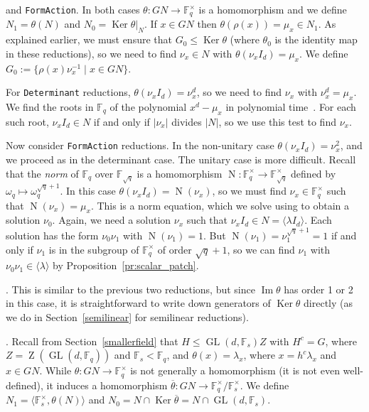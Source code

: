 \documentclass[12pt,twoside,reqno,psamsfonts]{amsproc}
\numberwithin{equation}{section}
\numberwithin{figure}{section}
\theoremstyle{plain}
\theoremstyle{definition}
\theoremstyle{remark}
\providecommand{\abs}[1]{\left\lvert #1 \right\rvert}
\newcommand{\field}[1]{\mathbb{#1}}
\newcommand{\F}{\field{F}}
\DeclareMathOperator{\GL}{GL}
\DeclareMathOperator{\Norm}{N}
\DeclareMathOperator{\Zent}{Z}
\DeclareMathOperator{\Ker}{Ker}
\DeclareMathOperator{\Imm}{Im}
\begin{document}
\vspace*{0.1cm}  and {\tt FormAction}.
In both cases $\theta:GN \to \F_q^{\times}$ is a homomorphism and we
define $N_1 = \theta(N)$ and $N_0 =  \Ker \theta|_N$.
If $x \in GN$ then $\theta(\rho(x)) = \mu_x \in N_1$.
As explained earlier, we must ensure that $G_0 \leqslant \Ker \theta$
(where $\theta_0$ is the identity map in these reductions),
so we need to find $\nu_x \in N$ with $\theta(\nu_x I_d) = \mu_x$.
We define $G_0 := \{ \rho(x) \nu_x^{-1} \mid x \in GN \}$.

For {\tt Determinant} reductions, $\theta(\nu_x I_d) = \nu_x^d$, so
we need to find $\nu_x$ with $\nu_x^d = \mu_x$. We 
find the roots in $\F_q$ of the polynomial $x^d - \mu_x$ in polynomial
time~\cite[Theorem 8.12]{Geddesetal92}.
For each such root, $\nu_x I_d \in N$ if and only if $\abs{\nu_x}$ divides
$\abs{N}$, so we use this test to find $\nu_x$.

Now consider {\tt FormAction} reductions. In the non-unitary case
$\theta(\nu_x I_d) = \nu_x^2$, and we proceed as in the determinant case.
The unitary case is more difficult. Recall that the \emph{norm} of
$\F_q$ over $\F_{\sqrt{q}}$ is a homomorphism 
$\Norm : \F_q^{\times} \to \F_{\sqrt{q}}^{\times}$ 
defined by $\omega_q \mapsto \omega_q^{\sqrt{q} + 1}$.
In this case $\theta(\nu_x I_d)  = \Norm(\nu_x)$, so we must find
$\nu_x \in \F_{q}^{\times}$ such that $\Norm(\nu_x) = \mu_x$. This is a norm
equation, which we solve using \cite[Proposition 2.2]{spinornorms} 
to obtain a solution $\nu_0$. Again, we need a solution $\nu_x$ such that
$\nu_x I_d \in N = \langle \lambda I_d \rangle$.
Each solution has the form $\nu_0 \nu_1$ with $\Norm(\nu_1) = 1$.
But $\Norm(\nu_1) = \nu_1^{\sqrt{q} + 1}= 1$ if and only if $\nu_1$ is in
the subgroup of $\F_{q}^{\times}$ of order $\sqrt{q} + 1$, so we can
find $\nu_1$ with $\nu_0 \nu_1 \in \langle \lambda \rangle$ by
Proposition~\ref{pr:scalar_patch}.

\vspace*{0.1cm} .
This is similar to the previous two reductions, but since $\Imm\theta$
has order 1 or 2 in this case, it is straightforward to write down
generators of $\Ker \theta$ directly (as we do 
in Section~\ref{semilinear} for semilinear reductions).

\vspace*{0.1cm} .
Recall from Section~\ref{smallerfield} that
$H \leqslant \GL(d, \F_s) Z$ with $H^c=G$,
where $Z = \Zent(\GL(d, \F_q))$ and $\F_s < \F_q$,
and $\theta(x) = \lambda_x$, where $x= h^c \lambda_x$ and $x \in GN$. 
While $\theta:GN \to \F_q^{\times}$ is not generally a
homomorphism (it is not even well-defined),
it induces a homomorphism
$\overline{\theta}:GN \to \F_q^{\times}/\F_s^{\times}$.
We define $N_1 = \langle \F_s^{\times}, \theta(N) \rangle$ and
$N_0 = N \cap \Ker \overline{\theta}=  N \cap \GL(d,\F_s)$.
\end{document}
